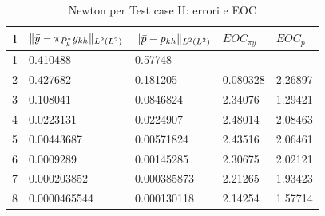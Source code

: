 \begin{table}
\caption{Newton per Test case II: errori e EOC }
\label{newtonIIbis}
\centering

\begin{tabular}{cllll}
\toprule
{l}  &  {$ \lVert\bar{y}-\pi_{P^*_k}y_{kh}\rVert_{L^2(L^2)} $}  &  {$ \lVert\bar{p}-p_{kh}\rVert_{L^2(L^2)} $}        &  {$ EOC_{\pi y} $} &  {$ EOC_p $} \\
\midrule
1 			 &  0.410488 &  0.57748 &  {$-$} & {$-$} \\
2            &  0.427682 &  0.181205 &  0.080328 &  2.26897 \\
3            &  0.108041 &  0.0846824 &  2.34076 &  1.29421 \\
4            &  0.0223131  &  0.0224907 &  2.48014 &  2.08463 \\
5            &  0.00443687 &  0.00571824 &  2.43516  &  2.06461 \\
6            &  0.0009289  &  0.00145285 &  2.30675 &  2.02121 \\
7            &  0.000203852 &  0.000385873 &  2.21265 &  1.93423 \\      
8            &  0.0000465544 &  0.000130118 &  2.14254 &  1.57714 \\
\bottomrule
\end{tabular}              

\end{table}


